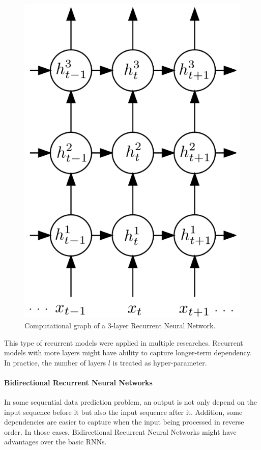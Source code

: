 \begin{figure}[H]
	\centering
	\includegraphics[scale=0.4]{figure/3-layer-lstm}
	\caption{Computational graph of a 3-layer Recurrent Neural Network\cite{GravesLSTM}.}
	\label{fig:3-layer-lstm}
\end{figure}

This type of recurrent models were applied in multiple researches\cite{GravesLSTM}\cite{SutskeverVL14}\cite{ZarembaS14}\cite{treeLSTM}.
Recurrent models with more layers might have ability to capture longer-term dependency\cite{treeLSTM}.
In practice, the number of layers \(l\) is treated as hyper-parameter.

\paragraph{Bidirectional Recurrent Neural Networks}\label{sec:bilstm}
In some sequential data prediction problem, an output is not only depend on the input sequence before it but also the input sequence after it. 
Addition, some dependencies are easier to capture when the input being processed in reverse order.
In those cases, Bidirectional Recurrent Neural Networks might have advantages over the basic RNNs\cite{GravesLSTM}\cite{Graves-thesis}.

